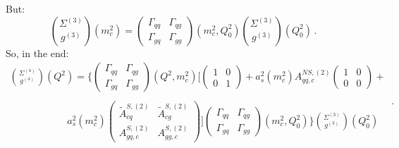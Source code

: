 \documentclass[10pt,a4paper]{article}
\begin{document}
But:
\begin{equation}
{\Sigma^{(3)} \choose g^{(3)}}(m_c^2) = \begin{pmatrix} \Gamma_{qq} &
  \Gamma_{qg} \\ \Gamma_{gq}&
  \Gamma_{gg}\end{pmatrix}(m_c^2,Q_0^2){\Sigma^{(3)} \choose
  g^{(3)}}(Q_0^2)\,.
\label{couple3mcQ0}
\end{equation}
So, in the end:
\begin{equation}
\begin{array}{l}
\displaystyle {\Sigma^{(4)} \choose g^{(4)}}(Q^2) = \Bigg\{\begin{pmatrix} \Gamma_{qq} & \Gamma_{qg} \\ \Gamma_{gq}& \Gamma_{gg}\end{pmatrix}(Q^2,m_c^2)\Bigg[\begin{pmatrix} 1 & 0 \\ 0 & 1\end{pmatrix}+a_s^2(m_c^2)A_{qq,c}^{N\!S,(2)}\begin{pmatrix} 1 & 0 \\ 0 & 0\end{pmatrix}+\\
\\
\hspace{70pt}\displaystyle a_s^2(m_c^2)\begin{pmatrix} \tilde{A}^{S,(2)}_{cq} & \tilde{A}^{S,(2)}_{cg} \\A^{S,(2)}_{gq,c} & A_{gg,c}^{S,(2)}\end{pmatrix}\Bigg]\begin{pmatrix} \Gamma_{qq} & \Gamma_{qg} \\ \Gamma_{gq}& \Gamma_{gg}\end{pmatrix}(m_c^2,Q_0^2)\Bigg\}{\Sigma^{(3)} \choose g^{(3)}}(Q_0^2)
\end{array}\,.
\label{couple43QQ0}
\end{equation}
\end{document}
